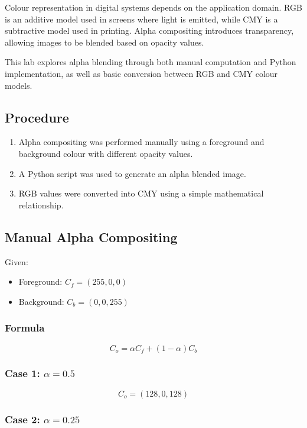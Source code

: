 \documentclass[12pt,a4paper]{article}
\begin{document}
Colour representation in digital systems depends on the application domain. RGB is an additive model used in screens where light is emitted, while CMY is a subtractive model used in printing. Alpha compositing introduces transparency, allowing images to be blended based on opacity values.

This lab explores alpha blending through both manual computation and Python implementation, as well as basic conversion between RGB and CMY colour models.

\subsection{Procedure}

\begin{enumerate}
    \item Alpha compositing was performed manually using a foreground and background colour with different opacity values.
    \item A Python script was used to generate an alpha blended image.
    \item RGB values were converted into CMY using a simple mathematical relationship.
\end{enumerate}

\subsection{Manual Alpha Compositing}

Given:
\begin{itemize}
    \item Foreground: $C_f = (255, 0, 0)$
    \item Background: $C_b = (0, 0, 255)$
\end{itemize}

\subsubsection{Formula}

\[
C_o = \alpha C_f + (1 - \alpha) C_b
\]

\subsubsection{Case 1: $\alpha = 0.5$}

\[
C_o = (128, 0, 128)
\]

\subsubsection{Case 2: $\alpha = 0.25$}
\end{document}
